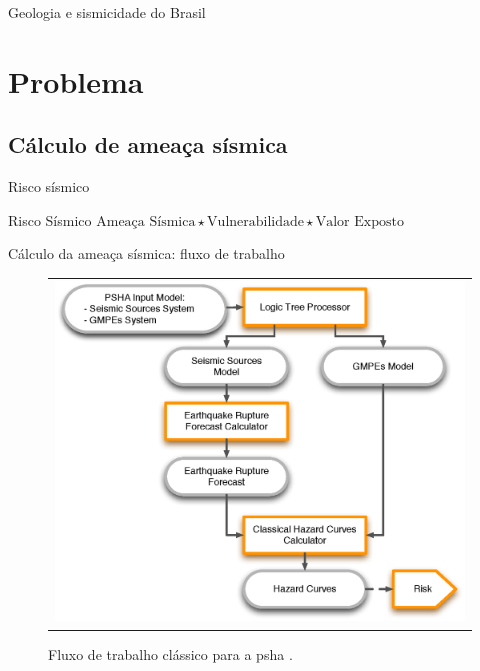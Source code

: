 \documentclass[ucs,8pt]{beamer}
\begin{document}
\begin{frame}{Geologia e sismicidade do Brasil}
\begin{figure}[H]
\begin{subfigure}[t]{0.48\textwidth}
	  \label{fig:br_seis} 
	\end{subfigure}
	\label{fig:eq_record}
\end{figure}
\end{frame}



\section{Problema}
\subsection{Cálculo de ameaça sísmica}


\begin{frame}{Risco sísmico}
\begin{block}{Risco Sísmico}
	\centering
	$\text{Ameaça Sísmica} \star \text{Vulnerabilidade} \star \text{Valor Exposto}$
\end{block}
\end{frame}


\begin{frame}{Cálculo da ameaça sísmica: fluxo de trabalho}
\begin{figure}[H]
	\centering
	\begin{tabular}{l}
	\includegraphics[height=0.90\textheight]{classical_psha_workflow}
	\end{tabular}
	\caption{Fluxo de trabalho clássico para a \gls{psha} \citep{crowley_2013}.}
\label{fig:classical_psha}
\end{figure}
\end{frame}
\end{document}
